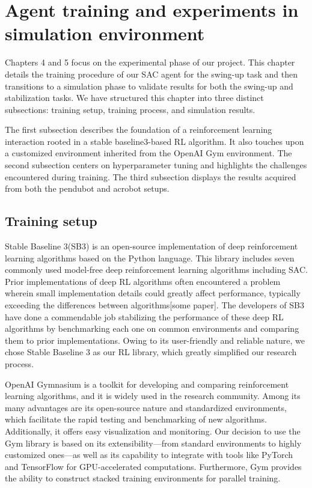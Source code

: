 \chapter{Agent training and experiments in simulation environment}
Chapters 4 and 5 focus on the experimental phase of our project. This chapter details the training procedure of our SAC agent for the swing-up task and then transitions to a simulation phase to validate results for both the swing-up and stabilization tasks. We have structured this chapter into three distinct subsections: training setup, training process, and simulation results.

The first subsection describes the foundation of a reinforcement learning interaction rooted in a stable baseline3-based RL algorithm. It also touches upon a customized environment inherited from the OpenAI Gym environment. The second subsection centers on hyperparameter tuning and highlights the challenges encountered during training. The third subsection displays the results acquired from both the pendubot and acrobot setups.

\section{Training setup}
Stable Baseline 3(SB3)\cite{stable-baselines3} is an open-source implementation of deep reinforcement learning algorithms based on the Python language. This library includes seven commonly used model-free deep reinforcement learning algorithms including SAC. Prior implementations of deep RL algorithms often encountered a problem wherein small implementation details could greatly affect performance, typically exceeding the differences between algorithms[some paper]. The developers of SB3 have done a commendable job stabilizing the performance of these deep RL algorithms by benchmarking each one on common environments and comparing them to prior implementations. Owing to its user-friendly and reliable nature, we chose Stable Baseline 3 as our RL library, which greatly simplified our research process.

OpenAI Gymnasium\cite{towers_gymnasium_2023} is a toolkit for developing and comparing reinforcement learning algorithms, and it is widely used in the research community. Among its many advantages are its open-source nature and standardized environments, which facilitate the rapid testing and benchmarking of new algorithms. Additionally, it offers easy visualization and monitoring. Our decision to use the Gym library is based on its extensibility—from standard environments to highly customized ones—as well as its capability to integrate with tools like PyTorch and TensorFlow for GPU-accelerated computations. Furthermore, Gym provides the ability to construct stacked training environments for parallel training.

